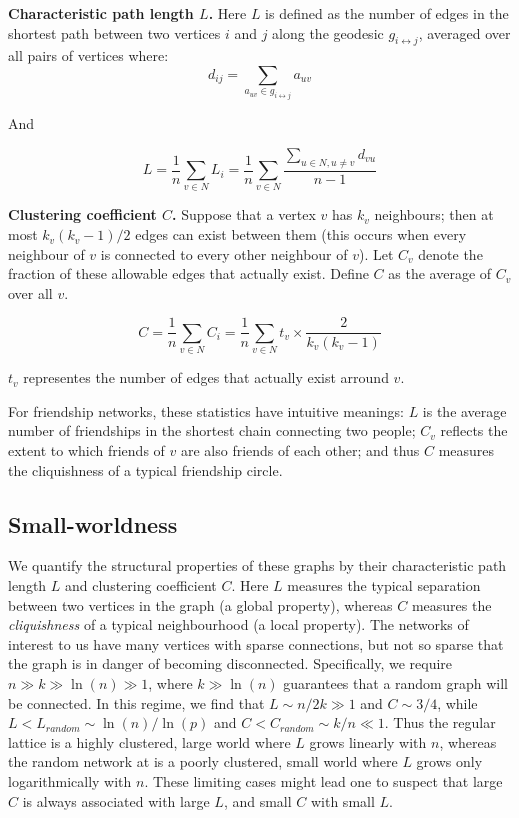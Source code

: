 \documentclass[final, paper=letter,5p,times,twocolumn]{elsarticle}
\begin{document}
\begin{definition}
  {\bf Characteristic path length $L$.} Here $L$ is defined as the number of edges in the shortest path between two vertices $i$ and $j$ along the geodesic $g_{i \leftrightarrow j}$, averaged over all pairs of vertices where:
  $$
  d_{ij} = \sum_{a_{uv} \in g_{i \leftrightarrow j}} a_{uv}
  $$

  And

  $$
  L = \frac{1}{n} \sum_{v \in N} L_{i} =  \frac{1}{n} \sum_{v \in N} \frac{\sum_{u \in N, u \ne v} d_{vu}}{n-1}
  $$
\end{definition}

\begin{definition}
  {\bf Clustering coefficient $C$.} Suppose that a vertex $v$ has $k_{v}$ neighbours; then at most $k_{v}(k_{v} -1)/2$ edges can exist between them (this occurs when every neighbour of $v$ is connected to every other neighbour of $v$). Let $C_{v}$ denote the fraction of these allowable edges that actually exist. Define $C$ as the average of $C_{v}$ over all $v$.

  $$
  C = \frac{1}{n} \sum_{v \in N} C_{i} = \frac{1}{n} \sum_{v \in N} t_{v} \times \frac{2}{k_{v}(k_{v} -1)}
  $$

  $t_{v}$ representes the number of edges that actually exist arround $v$.
\end{definition}

For friendship networks, these statistics have intuitive meanings: $L$ is the average number of friendships in the shortest chain connecting two people; $C_{v}$ reflects the extent to which friends of $v$ are also friends of each other; and thus $C$ measures the cliquishness of a typical friendship circle.

\subsection{Small-worldness}

We quantify the structural properties of these graphs by their characteristic path length $L$ and clustering coefficient $C$. Here $L$ measures the typical separation between two vertices in the graph (a global property), whereas $C$ measures the {\it cliquishness} of a typical neighbourhood (a local property). The networks of interest to us have many vertices with sparse connections, but not so sparse that the graph is in danger of becoming disconnected. Specifically, we require $n \gg k \gg \ln(n) \gg 1$, where $k \gg \ln(n)$ guarantees that a random graph will be connected. In this regime, we find that $L \sim n/2k \gg 1$ and $C \sim 3/4$, while $L < L_{random} \sim \ln(n) / \ln(p)$ and $C < C_{random} \sim k/n \ll 1$. Thus the regular lattice is a highly clustered, large world where $L$ grows linearly with $n$, whereas the random network at is a poorly clustered, small world where $L$ grows only logarithmically with $n$. These limiting cases might lead one to suspect that large $C$ is always associated with large $L$, and small $C$ with small $L$.
\end{document}
